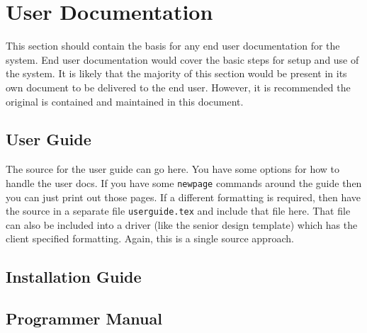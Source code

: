 

\chapter{User Documentation}

This section should contain the basis for any end user documentation for the system. 
 End user documentation would cover the basic steps for setup and use of the system. 
 It is likely that the majority of this section would be present in its own document 
to be delivered to the end user.  However, it is recommended the original is contained 
and maintained in this document. 


\section{User Guide}

The source for the user guide can go here.    You have some options for how to handle the user docs.  If you have some {\tt newpage} commands around the guide then you can just print out those pages.   If a different formatting is required, then have the source in a separate file {\tt userguide.tex} and include that file here.  That file can also be included into a driver (like the senior design template) which has the client specified formatting.  Again, this is a single source approach.   


\section{Installation Guide}


\section{Programmer Manual}

